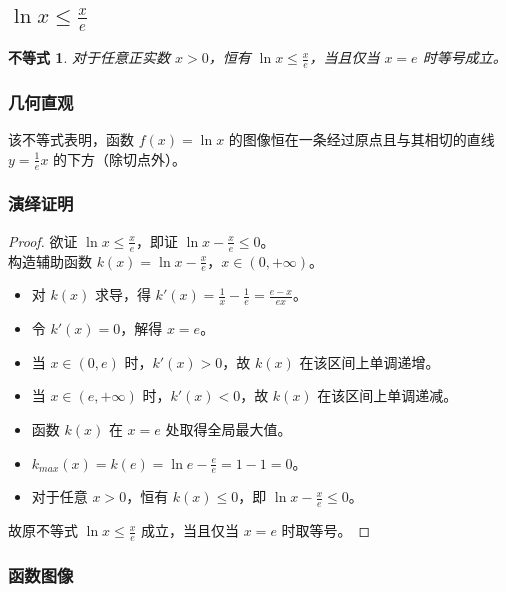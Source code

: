 \documentclass[a4paper,12pt]{ctexart}
\theoremstyle{mytheoremstyle}
\newtheorem{theorem}{不等式}
\begin{document}
\newpage
\subsection{\textcolor{MyPurple}{$\ln x \le \frac{x}{e}$}}

\begin{theorem}
对于任意正实数 $x>0$，恒有 $\ln x \le \frac{x}{e}$，当且仅当 $x=e$ 时等号成立。
\end{theorem}

\subsubsection*{\textcolor{MyGreen}{几何直观}}
该不等式表明，函数 $f(x) = \ln x$ 的图像恒在一条经过原点且与其相切的直线 $y = \frac{1}{e}x$ 的下方（除切点外）。

\subsubsection*{\textcolor{MyGreen}{演绎证明}}
\begin{proof}
欲证 $\ln x \le \frac{x}{e}$，即证 $\ln x - \frac{x}{e} \le 0$。\\
构造辅助函数 $k(x) = \ln x - \frac{x}{e}$，$x \in (0, +\infty)$。
\begin{itemize}
    \item[∵] 对 $k(x)$ 求导，得 $k'(x) = \frac{1}{x} - \frac{1}{e} = \frac{e-x}{ex}$。
    \item[∵] 令 $k'(x) = 0$，解得 $x=e$。
    \item[∵] 当 $x \in (0, e)$ 时，$k'(x) > 0$，故 $k(x)$ 在该区间上单调递增。
    \item[∵] 当 $x \in (e, +\infty)$ 时，$k'(x) < 0$，故 $k(x)$ 在该区间上单调递减。
    \item[∴] 函数 $k(x)$ 在 $x=e$ 处取得全局最大值。
    \item[∵] $k_{max}(x) = k(e) = \ln e - \frac{e}{e} = 1-1=0$。
    \item[∴] 对于任意 $x > 0$，恒有 $k(x) \le 0$，即 $\ln x - \frac{x}{e} \le 0$。
\end{itemize}
故原不等式 $\ln x \le \frac{x}{e}$ 成立，当且仅当 $x=e$ 时取等号。
\end{proof}

\subsubsection*{\textcolor{MyGreen}{函数图像}}
\begin{center}
\end{center}
\end{document}
